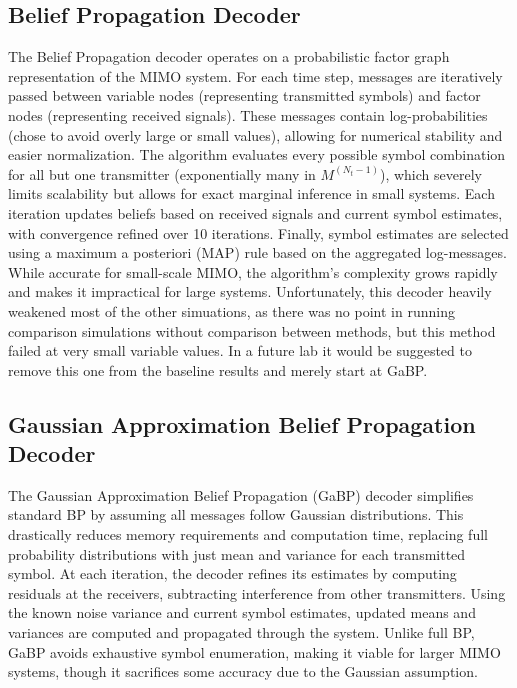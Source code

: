 \documentclass[conference]{IEEEtran}
\begin{document}
\subsection{Belief Propagation Decoder}
The Belief Propagation decoder operates on a probabilistic factor graph representation of the MIMO system. For each time step, messages are iteratively passed between variable nodes (representing transmitted symbols) and factor nodes (representing received signals). These messages contain log-probabilities (chose to avoid overly large or small values), allowing for numerical stability and easier normalization. The algorithm evaluates every possible symbol combination for all but one transmitter (exponentially many in $M^(N_t - 1)$), which severely limits scalability but allows for exact marginal inference in small systems. Each iteration updates beliefs based on received signals and current symbol estimates, with convergence refined over 10 iterations. Finally, symbol estimates are selected using a maximum a posteriori (MAP) rule based on the aggregated log-messages. While accurate for small-scale MIMO, the algorithm's complexity grows rapidly and makes it impractical for large systems. Unfortunately, this decoder heavily weakened most of the other simuations, as there was no point in running comparison simulations without comparison between methods, but this method failed at very small variable values. In a future lab it would be suggested to remove this one from the baseline results and merely start at GaBP.

\subsection{Gaussian Approximation Belief Propagation Decoder}
The Gaussian Approximation Belief Propagation (GaBP) decoder simplifies standard BP by assuming all messages follow Gaussian distributions. This drastically reduces memory requirements and computation time, replacing full probability distributions with just mean and variance for each transmitted symbol. At each iteration, the decoder refines its estimates by computing residuals at the receivers, subtracting interference from other transmitters. Using the known noise variance and current symbol estimates, updated means and variances are computed and propagated through the system. Unlike full BP, GaBP avoids exhaustive symbol enumeration, making it viable for larger MIMO systems, though it sacrifices some accuracy due to the Gaussian assumption.
\end{document}
